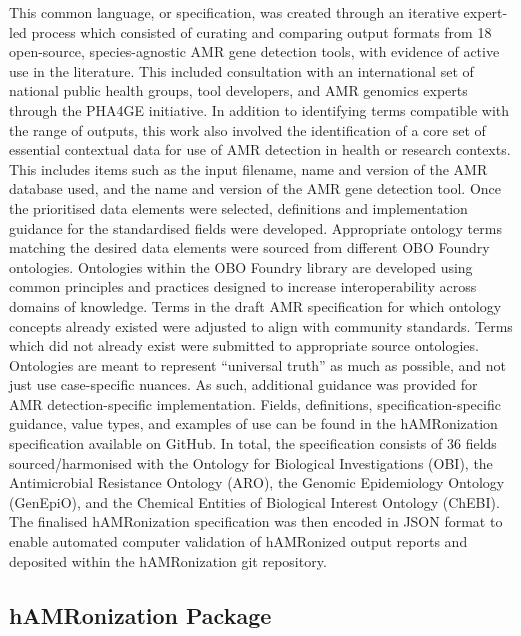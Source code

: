 This common language, or specification, was created through an iterative expert-led process which consisted of curating and comparing output formats from 18 open-source, species-agnostic AMR gene detection tools, with evidence of active use in the literature. This included consultation with an international set of national public health groups, tool developers, and AMR genomics experts through the PHA4GE initiative. In addition to identifying terms compatible with the range of outputs, this work also involved the identification of a core set of essential contextual data for use of AMR  detection in health or research contexts.  This includes items such as the input filename, name and version of the AMR database used, and the name and version of the AMR gene detection tool.  Once the prioritised data elements were selected, definitions and implementation guidance for the standardised fields were developed. Appropriate ontology terms matching the desired data elements were sourced from different OBO Foundry ontologies. Ontologies within the OBO Foundry library are developed using common principles and practices designed to increase interoperability across domains of knowledge. Terms in the draft AMR specification for which ontology concepts already existed were adjusted to align with community standards. Terms which did not already exist were submitted to appropriate source ontologies. Ontologies are meant to represent “universal truth” as much as possible, and not just use case-specific nuances. As such, additional guidance was provided for AMR detection-specific implementation. Fields, definitions, specification-specific guidance, value types, and examples of use can be found in the hAMRonization specification available on GitHub. In total, the specification consists of 36 fields sourced/harmonised with the Ontology for Biological Investigations (OBI), the Antimicrobial Resistance Ontology (ARO), the Genomic Epidemiology Ontology (GenEpiO), and the Chemical Entities of Biological Interest Ontology (ChEBI).  
The finalised hAMRonization specification was then encoded in JSON format to enable automated computer validation of hAMRonized output reports and deposited within the hAMRonization git repository.


\subsection{hAMRonization Package}

